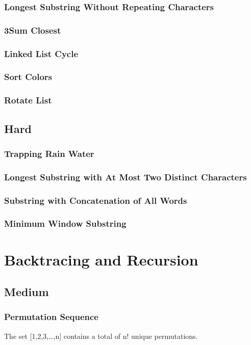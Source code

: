 \documentclass[12pt]{book}
\begin{document}
\subsection{Longest Substring Without Repeating Characters}
\label{sec-15-2-8}
\subsection{3Sum Closest}
\label{sec-15-2-9}
\subsection{Linked List Cycle}
\label{sec-15-2-10}
\subsection{Sort Colors}
\label{sec-15-2-11}
\subsection{Rotate List}
\label{sec-15-2-12}
\section{Hard}
\label{sec-15-3}
\subsection{Trapping Rain Water}
\label{sec-15-3-1}
\subsection{Longest Substring with At Most Two Distinct Characters}
\label{sec-15-3-2}
\subsection{Substring with Concatenation of All Words}
\label{sec-15-3-3}
\subsection{Minimum Window Substring}
\label{sec-15-3-4}
\chapter{Backtracing and Recursion}
\label{sec-16}
\section{Medium}
\label{sec-16-1}
\subsection{Permutation Sequence}
\label{sec-16-1-1}
The set [1,2,3,…,n] contains a total of n! unique permutations.
\end{document}

